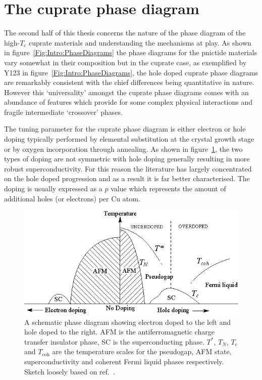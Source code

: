 
\section{The cuprate phase diagram}
    \label{Sec:Intro:PhaseDiagram}

The second half of this thesis concerns the nature of the phase diagram of the high-$T_c$ cuprate materials and understanding the mechanisms at play. As shown in figure~\ref{Fig:Intro:PhaseDiagrams} the phase diagrams for the pnictide materials vary somewhat in their composition but in the cuprate case, as exemplified by \ac{Y123} in figure~\ref{Fig:Intro:PhaseDiagrams}, the hole doped cuprate phase diagrams are remarkably consistent with the chief differences being quantitative in nature. However this `universality' amongst the cuprate phase diagrams comes with an abundance of features which provide for some complex physical interactions and fragile intermediate `crossover' phases. 

The tuning parameter for the cuprate phase diagram is either electron or hole doping typically performed by elemental substitution at the crystal growth stage or by oxygen incorporation through annealing. As shown in figure~\ref{Fig:Intro:ElecHolePhaseDiagram}, the two types of doping are not symmetric with hole doping generally resulting in more robust superconductivity. For this reason the literature has largely concentrated on the hole doped progression and as a result it is far better characterised. The doping is usually expressed as a $p$ value which represents the amount of additional holes (or electrons) per Cu atom.
\begin{figure}[htbp]
    \begin{center}
        \includegraphics[scale=1.4]{Chapter-Introduction/Figures/ElecHolePhaseDiagram/ElecHolePhaseDiagram}
        \caption{A schematic phase diagram showing electron doped to the left and hole doped to the right. \ac{AFM} is the antiferromagnetic charge transfer insulator phase, SC is the superconducting phase. $T^*$, $T_N$, $T_c$ and $T_{\textrm{coh}}$ are the temperature scales for the pseudogap, \ac{AFM} state, superconductivity and coherent Fermi liquid phases respectively. Sketch loosely based on ref.~\cite{Orenstein2010}.}
        \label{Fig:Intro:ElecHolePhaseDiagram}
    \end{center}
\end{figure}

